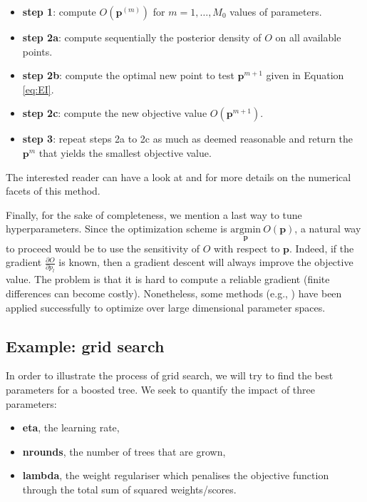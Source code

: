 \documentclass[]{krantz}
\providecommand{\tightlist}{%
  \setlength{\itemsep}{0pt}\setlength{\parskip}{0pt}}
\theoremstyle{definition}
\theoremstyle{definition}
\theoremstyle{definition}
\theoremstyle{remark}
\begin{document}
\begin{itemize}
\tightlist
\item
  \textbf{step 1}: compute \(O(\textbf{p}^{(m)})\) for \(m=1,\dots,M_0\)
  values of parameters.\\
\item
  \textbf{step 2a}: compute sequentially the posterior density of \(O\)
  on all available points.\\
\item
  \textbf{step 2b}: compute the optimal new point to test
  \(\textbf{p}^{m+1}\) given in Equation \eqref{eq:EI}.\\
\item
  \textbf{step 2c}: compute the new objective value
  \(O(\textbf{p}^{m+1})\).\\
\item
  \textbf{step 3}: repeat steps 2a to 2c as much as deemed reasonable
  and return the \(\textbf{p}^{m}\) that yields the smallest objective
  value.
\end{itemize}

The interested reader can have a look at \citet{snoek2012practical} and
\citet{frazier2018tutorial} for more details on the numerical facets of
this method.

Finally, for the sake of completeness, we mention a last way to tune
hyperparameters. Since the optimization scheme is
\(\underset{\textbf{p}}{\text{argmin}} \ O(\textbf{p})\), a natural way
to proceed would be to use the sensitivity of \(O\) with respect to
\(\textbf{p}\). Indeed, if the gradient
\(\frac{\partial O}{\partial p_l}\) is known, then a gradient descent
will always improve the objective value. The problem is that it is hard
to compute a reliable gradient (finite differences can become costly).
Nonetheless, some methods (e.g., \citet{maclaurin2015gradient}) have
been applied successfully to optimize over large dimensional parameter
spaces.

\hypertarget{example-grid-search}{%
\subsection{Example: grid search}\label{example-grid-search}}

In order to illustrate the process of grid search, we will try to find
the best parameters for a boosted tree. We seek to quantify the impact
of three parameters:

\begin{itemize}
\tightlist
\item
  \textbf{eta}, the learning rate,\\
\item
  \textbf{nrounds}, the number of trees that are grown,\\
\item
  \textbf{lambda}, the weight regulariser which penalises the objective
  function through the total sum of squared weights/scores.
\end{itemize}
\end{document}
